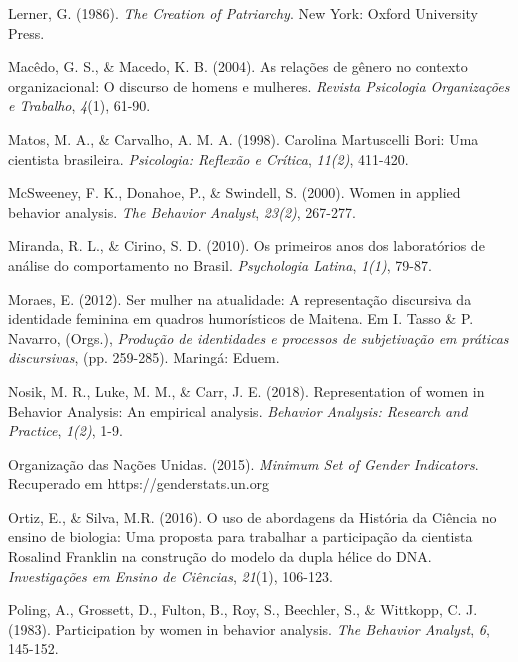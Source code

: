 \hangindent=25pt
\noindent Lerner, G. (1986). \textit{The Creation of Patriarchy}. New York: Oxford University Press.

\hangindent=25pt
\noindent Macêdo, G. S., \& Macedo, K. B. (2004). As relações de gênero no contexto organizacional: O discurso de homens e mulheres. \textit{Revista Psicologia Organizações e Trabalho},\textit{ 4}(1), 61-90. 

\hangindent=25pt
\noindent Matos, M. A., \& Carvalho, A. M. A. (1998). Carolina Martuscelli Bori: Uma cientista brasileira. \textit{Psicologia: Reflexão e Crítica},\textit{ 11(2)}, 411-420. 
 
\hangindent=25pt
\noindent McSweeney, F. K., Donahoe, P., \& Swindell, S. (2000). Women in applied behavior analysis. \textit{The Behavior Analyst},\textit{ 23(2)}, 267-277.

\hangindent=25pt
\noindent Miranda, R. L., \& Cirino, S. D. (2010). Os primeiros anos dos laboratórios de análise do comportamento no Brasil. \textit{Psychologia Latina},\textit{ 1(1)}, 79-87.

\hangindent=25pt
\noindent Moraes, E. (2012). Ser mulher na atualidade: A representação discursiva da identidade feminina em quadros humorísticos de Maitena. Em I. Tasso \& P. Navarro, (Orgs.), \textit{Produção de identidades e processos de subjetivação em práticas discursivas}, (pp. 259-285). Maringá: Eduem.

\hangindent=25pt
\noindent Nosik, M. R., Luke, M. M., \& Carr, J. E. (2018). Representation of women in Behavior Analysis: An empirical analysis. \textit{Behavior Analysis: Research and Practice},\textit{ 1(2)}, 1-9.

\hangindent=25pt
\noindent Organização das Nações Unidas. (2015). \textit{Minimum Set of Gender Indicators}. Recuperado em https://genderstats.un.org

\hangindent=25pt
\noindent Ortiz, E., \& Silva, M.R. (2016). O uso de abordagens da História da Ciência no ensino de biologia: Uma proposta para trabalhar a participação da cientista Rosalind Franklin na construção do modelo da dupla hélice do DNA. \textit{Investigações em Ensino de Ciências},\textit{ 21}(1), 106-123. 

\hangindent=25pt
\noindent Poling, A., Grossett, D., Fulton, B., Roy, S., Beechler, S., \& Wittkopp, C. J. (1983). Participation by women in behavior analysis.\textit{ The Behavior Analyst},\textit{ 6}, 145-152.

